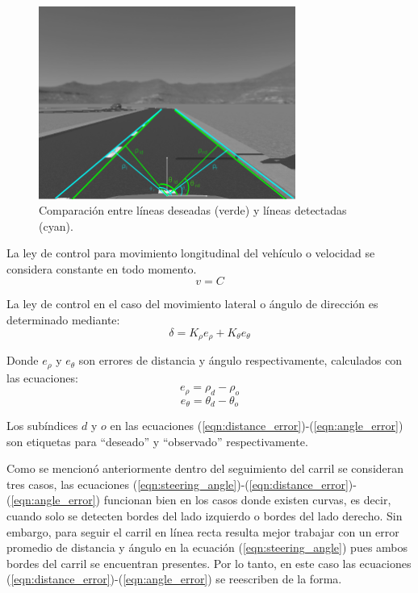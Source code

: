 \begin{figure}
    \centering
    \includegraphics[width=0.75\textwidth]{Figures/Figures_Cap04/lines_control_laws.png}
    \caption{Comparación entre líneas deseadas (verde) y líneas detectadas (cyan).}
    \label{fig:línes_desired_lines_detected}
\end{figure}

La ley de control para movimiento longitudinal del vehículo o velocidad se considera constante en todo momento.
\begin{equation}
    v = C
    \label{eqn:cruise_speed}
\end{equation}

La ley de control en el caso del movimiento lateral o ángulo de dirección es determinado mediante:
\begin{equation}
    \delta = K_\rho e_\rho + K_\theta e_\theta
    \label{eqn:steering_angle}
\end{equation}

Donde $e_\rho$ y $e_\theta$ son errores de distancia y ángulo respectivamente, calculados con las ecuaciones:
\begin{equation}
    e_\rho = \rho_d - \rho_o
    \label{eqn:distance_error}
\end{equation}
\begin{equation}
    e_\theta = \theta_d - \theta_o
    \label{eqn:angle_error}
\end{equation}

Los subíndices $d$ y $o$ en las ecuaciones (\ref{eqn:distance_error})-(\ref{eqn:angle_error}) son etiquetas para ``deseado'' y ``observado'' respectivamente.

Como se mencionó anteriormente dentro del seguimiento del carril se consideran tres casos, las ecuaciones (\ref{eqn:steering_angle})-(\ref{eqn:distance_error})-(\ref{eqn:angle_error}) funcionan bien en los casos donde existen curvas, es decir, cuando solo se detecten bordes del lado izquierdo o bordes del lado derecho. Sin embargo, para seguir el carril en línea recta resulta mejor trabajar con un error promedio de distancia y ángulo en la ecuación (\ref{eqn:steering_angle}) pues ambos bordes del carril se encuentran presentes. Por lo tanto, en este caso las ecuaciones (\ref{eqn:distance_error})-(\ref{eqn:angle_error}) se reescriben de la forma.


